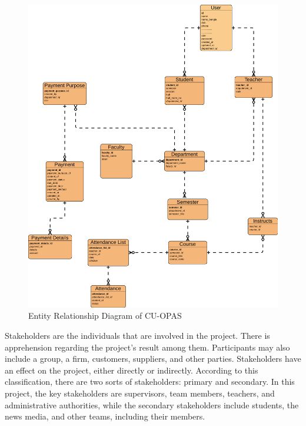 \begin{figure}[H]
    \centering
    \label{fig:erd}
    \includegraphics[width=1\textwidth]{images/erd}
    \caption{Entity Relationship Diagram of CU-OPAS}
\end{figure}
Stakeholders are the individuals that are involved in the project. There is apprehension regarding the project's result among them. Participants may also include a group, a firm, customers, suppliers, and other parties. Stakeholders have an effect on the project, either directly or indirectly. According to this classification, there are two sorts of stakeholders: primary and secondary. In this project, the key stakeholders are supervisors, team members, teachers, and administrative authorities, while the secondary stakeholders include students, the news media, and other teams, including their members.
\clearpage